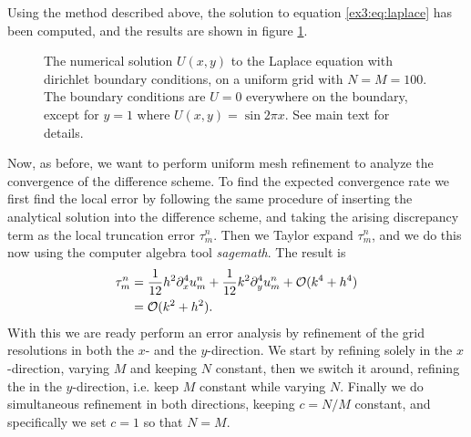 Using the method described above, the solution to equation \ref{ex3:eq:laplace} has been computed, and the results are shown in figure \ref{ex3:fig:heat_map}.
\begin{figure}[tbp]
    \centering
    \caption{The numerical solution $U(x, y)$ to the Laplace equation with dirichlet boundary conditions, on a uniform grid with $N = M = 100$.
      The boundary conditions are $U = 0$ everywhere on the boundary, except for $y=1$ where $U(x,y) = \sin 2 \pi x$.
      See main text for details.
    }
    \label{ex3:fig:heat_map}
\end{figure}

Now, as before, we want to perform uniform mesh refinement to analyze the convergence of the difference scheme. 
To find the expected convergence rate we first find the local error by following the same procedure of inserting the analytical solution into the difference scheme, 
and taking the arising discrepancy term as the local truncation error $\tau_m^n$. 
Then we Taylor expand $\tau_m^n$, and we do this now using the computer algebra tool \textit{sagemath}. 
The result is 
\begin{align*}
    \tau_m^n & = \frac{1}{12}h^2\partial_x^4 u_m^n + \frac{1}{12}k^2\partial_y^4 u_m^n + \mathcal{O}(k^4 + h^4)\\
             & = \mathcal{O}(k^2 + h^2). 
\end{align*}
With this we are ready perform an error analysis by refinement of the grid resolutions in both the $x$- and the $y$-direction. 
We start by refining solely in the $x$-direction, varying $M$ and keeping $N$ constant, 
then we switch it around, refining the in the $y$-direction, i.e. keep $M$ constant while varying $N$. 
Finally we do simultaneous refinement in both directions, keeping $c = N/M$ constant, 
and specifically we set $c=1$ so that $N = M$. 

